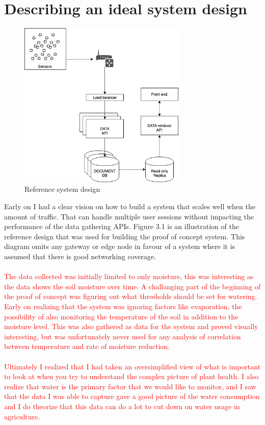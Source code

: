 \documentclass[]{uiophd}
\begin{document}
\section{Describing an ideal system design}
\begin{figure}[h]
\caption{Reference system design}
\centering
\includegraphics[width=8cm]{ideal_system_design.png}

\end{figure}
Early on I had a clear vision on how to build a system that scales well when the amount of traffic. That can handle multiple user sessions without impacting the performance of the data gathering APIs. Figure 3.1 is an illustration of the reference design that was used for building the proof of concept system. This diagram omits any gateway or edge node in favour of a system where it is assumed that there is good networking coverage.
\\\\
\textcolor{red}{The data collected was initially limited to only moisture, this was interesting as the data shows the soil moisture over time. A challanging part of the beginning of the proof of concept was figuring out what thresholds should be set for watering. Early on realizing that the system was ignoring factors like evaporation, the possibility of also monitoring the temperature of the soil in addition to the moisture level. This was also gathered as data for the system and proved visually interesting, but was unfortunately never used for any analysis of correlation between temperature and rate of moisture reduction.
\\\\
Ultimately I realized that I had taken an oversimplified view of what is important to look at when you try to understand the complex picture of plant health. I also realize that water is the primary factor that we would like to monitor, and I saw that the data I was able to capture gave a good picture of the water consumption and I do theorize that this data can do a lot to cut down on water usage in agriculture.}
\end{document}
